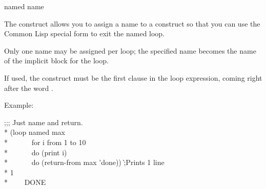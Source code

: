 \begin{defloop}
named name

The  construct allows you to assign a name to a 
construct so that you can use the Common Lisp special form 
 to exit the named loop.

Only one name may be assigned per loop; the specified name becomes the
name of the implicit block for the loop.

If used, the 
construct must be the first clause in the loop expression, coming right after the
word .

Example:
\begin{lisp}
;;; Just name and return. \\*
(loop named max \\*
~~~~~~for i from 1 to 10 \\*
~~~~~~do (print i) \\*
~~~~~~do (return-from max 'done)) \`;{\rm Prints 1 line}\\*
1  \\*
~~~\EV~DONE
\end{lisp}
\end{defloop}

